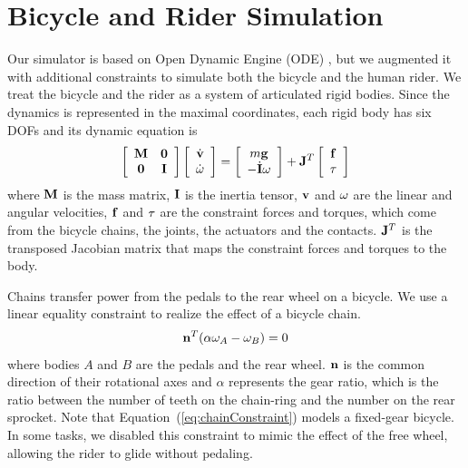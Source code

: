 \section{Bicycle and Rider Simulation}
Our simulator is based on Open Dynamic Engine (ODE) \cite{ode:2008},
but we augmented it with additional constraints to simulate both the
bicycle and the human rider. We treat the bicycle and the rider as a
system of articulated rigid bodies. Since the dynamics is represented
in the maximal coordinates, each rigid body has six DOFs and its
dynamic equation is
\begin{equation}
\left[\begin{array}{cc}
\mathbf{M} & \mathbf{0} \\
\mathbf{0} & \mathbf{I}
\end{array}\right]
\left[\begin{array}{c}
\dot{\mathbf{v}} \\
\dot{\mathbf{\omega}}
\end{array}\right]=
\left[\begin{array}{c}
m\mathbf{g} \\
-\dot{\mathbf{I}}\mathbf{\omega}
\end{array}\right]
+\mathbf{J}^T
\left[\begin{array}{c}
\mathbf{f}\\
\mathbf{\tau}
\end{array}\right]
\label{eq:dynamics}
\end{equation}
where $\mathbf{M}$ is the mass matrix, $\mathbf{I}$ is the inertia tensor, $\mathbf{v}$ and $\mathbf{\omega}$ are the linear and angular velocities, $\mathbf{f}$ and $\mathbf{\tau}$ are the constraint forces and torques, which come from the bicycle chains, the joints, the actuators and the contacts. $\mathbf{J}^T$ is the transposed Jacobian matrix that maps the constraint forces and torques to the body.

Chains transfer power from the pedals to the rear wheel on a bicycle. We use a linear equality constraint to realize the effect of a bicycle chain.
\begin{equation}
\mathbf{n}^T(\alpha\mathbf{\omega}_A-\mathbf{\omega}_B)=0
\label{eq:chainConstraint}
\end{equation}
where bodies $A$ and $B$ are the pedals and the rear wheel. $\mathbf{n}$ is the common direction of their rotational axes and $\alpha$ represents the gear ratio, which is the ratio between the number of teeth on the chain-ring and the number on the rear sprocket. Note that Equation~(\ref{eq:chainConstraint}) models a fixed-gear bicycle. In some tasks, we disabled this constraint to mimic the effect of the free wheel, allowing the rider to glide without pedaling.

